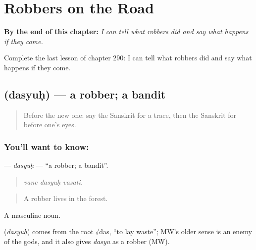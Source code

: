 
\chapter{Robbers on the Road}
\label{ch:sa-robbers-on-the-road}

\begin{chapteropening}
\textbf{By the end of this chapter:} \emph{I can tell what robbers did and say what happens if they come.}

Complete the last lesson of chapter 290: I can tell what robbers did and say what happens if they come.
\end{chapteropening}

\section[\texorpdfstring{\sk{दस्युः} (dasyuḥ)}{दस्युः (dasyuḥ)}]{ (dasyuḥ) — a robber; a bandit}

\label{lesson:SA-C290-dasyuh}



\begin{quote}
Before the new one: say the Sanskrit for a trace, then the Sanskrit for before one's eyes.
\end{quote}

\subsection*{You'll want to know: }
\textbf{} — \emph{dasyuḥ} — \textquotedblleft{}a robber; a bandit\textquotedblright{}.

\begin{quote}
  
\end{quote}

\begin{quote}
\emph{vane dasyuḥ vasati.}
\end{quote}

\begin{quote}
A robber lives in the forest.
\end{quote}

A masculine noun.

\begin{cousinweb}
\textbf{} (\emph{dasyuḥ}) comes from the root √das, \textquotedblleft{}to lay waste\textquotedblright{}; MW's older sense is an enemy of the gods, and it also gives \emph{dasyu} as a robber (MW).
\end{cousinweb}

